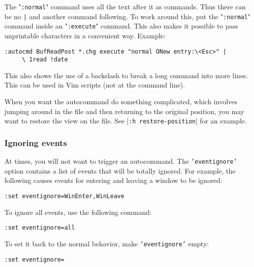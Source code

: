 The "\texttt{:normal}" command uses all the text after it as commands.
Thus there can be no \texttt{|} and another command following.
To work around this, put the "\texttt{:normal}" command inside an "\texttt{:execute}" command.
This also makes it possible to pass unprintable characters in a convenient way.
Example:

\begin{Verbatim}[samepage=true]
 :autocmd BufReadPost *.chg execute "normal ONew entry:\<Esc>" |
     \ 1read !date
\end{Verbatim}

This also shows the use of a backslash to break a long command into more lines.
This can be used in Vim scripts (not at the command line).

When you want the autocommand do something complicated, which involves jumping around in the file and then returning to the original position, you may want to restore the view on the file.
See |\texttt{:h restore-position}| for an example.
\subsubsection{Ignoring events}
At times, you will not want to trigger an autocommand.
The \texttt{'eventignore'} option contains a list of events that will be totally ignored.
For example, the following causes events for entering and leaving a window to be ignored:

\begin{Verbatim}[samepage=true]
 :set eventignore=WinEnter,WinLeave
\end{Verbatim}

To ignore all events, use the following command:

\begin{Verbatim}[samepage=true]
 :set eventignore=all
\end{Verbatim}

To set it back to the normal behavior, make \texttt{'eventignore'} empty:

\begin{Verbatim}[samepage=true]
 :set eventignore=
\end{Verbatim}

\clearpage

